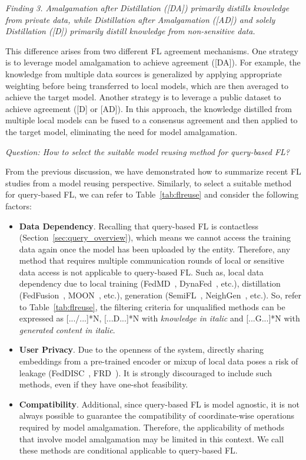 \textit{Finding 3. Amalgamation after Distillation ([DA]) primarily distills knowledge from private data, while Distillation after Amalgamation ([AD]) and solely Distillation ([D]) primarily distill knowledge from non-sensitive data.}

This difference arises from two different FL agreement mechanisms. 
One strategy is to leverage model amalgamation to achieve agreement ([DA]). 
For example, the knowledge from multiple data sources is generalized by applying appropriate weighting before being transferred to local models, which are then averaged to achieve the target model.
Another strategy is to leverage a public dataset to achieve agreement ([D] or [AD]). 
In this approach, the knowledge distilled from multiple local models can be fused to a consensus agreement and then applied to the target model, eliminating the need for model amalgamation.

\textit{Question: How to select the suitable model reusing method for query-based FL?}%

From the previous discussion, we have demonstrated how to summarize recent FL studies from a model reusing perspective.
Similarly, to select a suitable method for query-based FL, we can refer to Table~\ref{tab:flreuse} and consider the following factors:
\begin{itemize}
  \item \textbf{Data Dependency}. Recalling that query-based FL is contactless (Section~\ref{sec:query_overview}), which means we cannot access the training data again once the model has been uploaded by the entity.
  Therefore, any method that requires multiple communication rounds of local or sensitive data access is not applicable to query-based FL.
  Such as, local data dependency due to local training (FedMD~\cite{li2019fedmd}, DynaFed~\cite{pi2022dynafed}, etc.), distillation (FedFusion~\cite{yao2019towards}, MOON~\cite{li2021model}, etc.), generation (SemiFL~\cite{diao2022semifl}, NeighGen~\cite{zhang2021subgraph}, etc.).
  So, refer to Table~\ref{tab:flreuse}, the filtering criteria for unqualified methods can be expressed as [.../...]*N, [...D...]*N with \textit{knowledge in italic} and [...G...]*N with \textit{generated content in italic}.
  \item \textbf{User Privacy}. Due to the openness of the system, directly sharing embeddings from a pre-trained encoder or mixup of local data poses a risk of leakage (FedDISC~\cite{yang2023exploring}, FRD~\cite{cha2019federated}). It is strongly discouraged to include such methods, even if they have one-shot feasibility.
  \item \textbf{Compatibility}. Additional, since query-based FL is model agnostic, it is not always possible to guarantee the compatibility of coordinate-wise operations required by model amalgamation. Therefore, the applicability of methods that involve model amalgamation may be limited in this context. We call these methods are conditional applicable to query-based FL.
\end{itemize}


